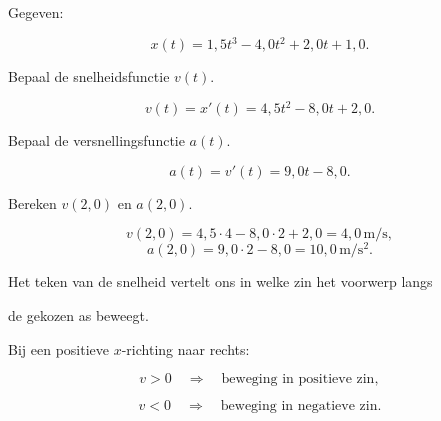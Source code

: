 \documentclass{ximera}
\begin{document}
\begin{oefening}{\oefB\ESS}

Gegeven:

\[x(t)=1,5t^3-4,0t^2+2,0t+1,0.\]

\begin{question}

Bepaal de snelheidsfunctie $v(t)$.

\begin{oplossing}
\[v(t)=x'(t)=4,5t^2-8,0t+2,0.\]
\end{oplossing}

\end{question}

\begin{question}

Bepaal de versnellingsfunctie $a(t)$.

\begin{oplossing}
\[a(t)=v'(t)=9,0t-8,0.\]
\end{oplossing}

\end{question}

\begin{question}

Bereken $v(2,0)$ en $a(2,0)$.

\begin{oplossing}
\[v(2,0)=4,5\cdot4-8,0\cdot2+2,0=4,0\,\mathrm{m/s},\]
\[a(2,0)=9,0\cdot2-8,0=10,0\,\mathrm{m/s^2}.\]
\end{oplossing}

\end{question}

\end{oefening}





Het teken van de snelheid vertelt ons in welke zin het voorwerp langs

de gekozen as beweegt.

Bij een positieve $x$-richting naar rechts:

\[v>0 \quad\Rightarrow\quad \text{beweging in positieve zin},\]

\[v<0 \quad\Rightarrow\quad \text{beweging in negatieve zin}.\]
\end{document}

